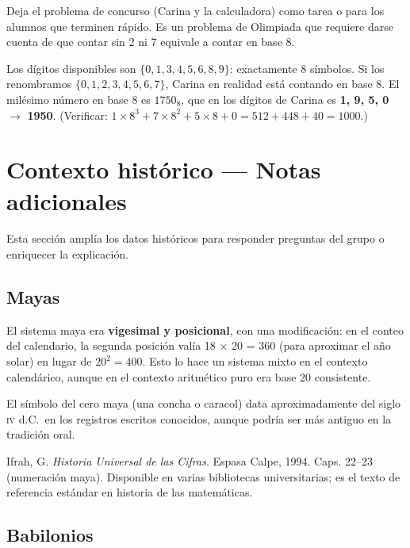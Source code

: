 \documentclass[12pt, oneside]{article}
\begin{document}
Deja el problema de concurso (Carina y la calculadora) como tarea o para
los alumnos que terminen rápido. Es un problema de Olimpiada que requiere
darse cuenta de que contar sin 2 ni 7 equivale a contar en base 8.

\begin{notaprofesor}
  Los dígitos disponibles son $\{0, 1, 3, 4, 5, 6, 8, 9\}$: exactamente 8
  símbolos. Si los renombramos $\{0,1,2,3,4,5,6,7\}$, Carina en realidad
  está contando en base 8. El milésimo número en base 8 es $1750_8$,
  que en los dígitos de Carina es \textbf{1, 9, 5, 0} $\to$ \textbf{1950}.
  (Verificar: $1\times 8^3 + 7\times 8^2 + 5\times 8 + 0 = 512+448+40 = 1000$.)
\end{notaprofesor}

\section{Contexto histórico — Notas adicionales}

Esta sección amplía los datos históricos para responder preguntas del grupo
o enriquecer la explicación.

\subsection{Mayas}

El sistema maya era \textbf{vigesimal y posicional}, con una modificación:
en el conteo del calendario, la segunda posición valía 18 × 20 = 360 (para
aproximar el año solar) en lugar de $20^2 = 400$. Esto lo hace un sistema
mixto en el contexto calendárico, aunque en el contexto aritmético puro
era base 20 consistente.

El símbolo del cero maya (una concha o caracol) data aproximadamente del
siglo \textsc{iv} d.C.\ en los registros escritos conocidos, aunque podría
ser más antiguo en la tradición oral.

\begin{notaprofesor}[Referencia]
  Ifrah, G. \textit{Historia Universal de las Cifras}. Espasa Calpe, 1994.
  Caps. 22–23 (numeración maya). Disponible en varias bibliotecas
  universitarias; es el texto de referencia estándar en historia de las
  matemáticas.
\end{notaprofesor}

\subsection{Babilonios}
\end{document}
